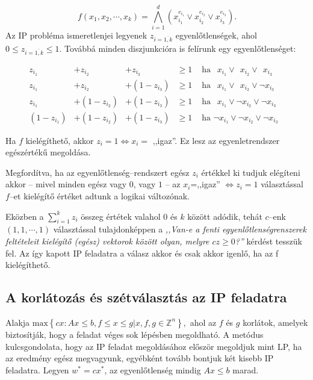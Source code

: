 \[ f(x_1, x_2, \cdots, x_k) = \bigwedge_{i=1}^{d}{\left( x_{i_1}^{e_{i_1}} \vee 
x_{i_2}^{e_{i_2}} \vee x_{i_3}^{e_{i_3}}\right).} 
\]
Az IP probléma ismeretlenjei legyenek $z_{i=\overline{1,k}}$ egyenlőtlenségek,
ahol $0 \leq z_{i=\overline{1,k}} \leq 1$. Továbbá minden diszjunkcióra is felírunk egy
egyenlőtlenséget:


\begin{align*}
z_{i_1} &+ z_{i_2} &+      z_{i_3}  &\geq 1 & \mbox{ ha }~~x_{i_1} \vee~~x_{i_2}\vee~~x_{i_3}& \\
z_{i_1} &+ z_{i_2} &+ (1 - z_{i_3}) &\geq 1 & \mbox{ ha }~~x_{i_1} \vee~~x_{i_2} \vee \neg x_{i_3}& \\
z_{i_1} &+ (1-z_{i_2}) &+ (1 - z_{i_3})  &\geq 1 & \mbox{ ha }~~x_{i_1} \vee \neg x_{i_2} \vee\neg x_{i_3}&\\
(1-z_{i_1}) &+ (1-z_{i_2}) &+ (1 - z_{i_3})  &\geq 1 & \mbox{ ha } \neg x_{i_1} \vee \neg x_{i_2} \vee \neg x_{i_3}&
\end{align*}

Ha $f$ kielégíthető, akkor $z_i=1 \Leftrightarrow x_i=$ ,,igaz''. Ez lesz az
egyenletrendszer egészértékű megoldása. 

Megfordítva, ha az egyenlőtlenség--rendszert egész $z_i$ értékkel ki tudjuk
elégíteni akkor -- mivel minden egész vagy $0$, vagy $1$ -- az $x_i$=,,igaz''
$\Leftrightarrow z_i=1$ választással $f$--et kielégítő értéket adtunk a logikai
változónak.

Eközben a $\sum_{i=1}^{k}{z_i}$ összeg értétek valahol $0$ és $k$ között adódik,
tehát $c$--enk $(1,1,\cdots,1)$ választással tulajdonképpen a \emph{,,Van-e a fenti
egyenlőtlenségrenszerek feltételeit kielégítő (egész) vektorok között olyan,
melyre $cz \geq 0$?''} kérdést tesszük fel. Az így kapott IP feladatra a válasz
akkor és csak akkor igenlő, ha az f kielégíthető.

\subsection{A korlátozás és szétválasztás az IP feladatra}

Alakja $\mbox{max} \left\{cx:Ax \leq b, f \leq x \leq g| x,f,g \in \mathbb{Z}^n
\right\},$ ahol az $f$ és $g$ korlátok, amelyek biztosítják, hogy a feladat véges sok
lépésben megoldható. A metódus kulcsgondolata, hogy az IP feladat megoldásához először
megoldjuk mint LP, ha az eredmény egész megvagyunk, egyébként tovább bontjuk két kisebb
IP feladatra. Legyen $w^*=cx^*$, az egyenlőtlenség mindig $Ax \leq b$ marad.


